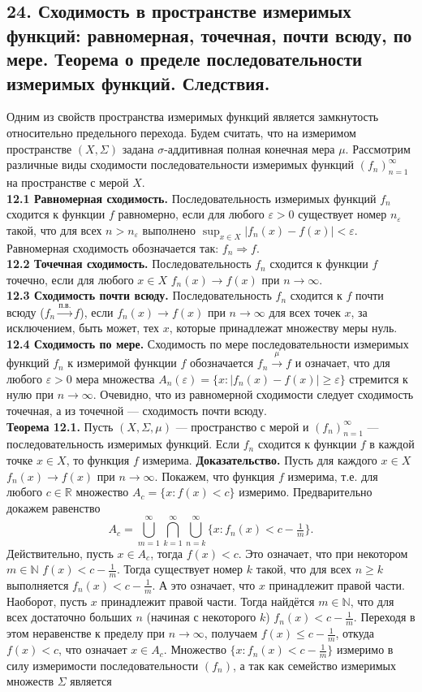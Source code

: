 \documentclass[12pt]{article}
\begin{document}
\subsection*{24. Сходимость в пространстве измеримых функций: равномерная, точечная, почти всюду,
по мере. Теорема о пределе последовательности измеримых функций. Следствия.}
Одним из свойств пространства измеримых функций является замкнутость относительно предельного перехода. Будем считать, что на измеримом пространстве $(X,\Sigma)$ задана $\sigma$-аддитивная полная конечная мера $\mu$. Рассмотрим различные виды сходимости последовательности измеримых функций $(f_n)_{n=1}^\infty$ на пространстве с мерой $X$.\\ \textbf{12.1 Равномерная сходимость.} Последовательность измеримых функций $f_n$ сходится к функции $f$ равномерно, если для любого $\varepsilon>0$ существует номер $n_\varepsilon$ такой, что для всех $n>n_\varepsilon$ выполнено $\sup_{x\in X}|f_n(x)-f(x)|<\varepsilon$. Равномерная сходимость обозначается так: $f_n\Rightarrow f$. \\\textbf{12.2 Точечная сходимость.} Последовательность $f_n$ сходится к функции $f$ точечно, если для любого $x\in X$ $f_n(x)\to f(x)$ при $n\to\infty$. \\\textbf{12.3 Сходимость почти всюду.} Последовательность $f_n$ сходится к $f$ почти всюду ($f_n\overset{\text{п.в.}}{\longrightarrow}f$), если $f_n(x)\to f(x)$ при $n\to\infty$ для всех точек $x$, за исключением, быть может, тех $x$, которые принадлежат множеству меры нуль. \\\textbf{12.4 Сходимость по мере.} Сходимость по мере последовательности измеримых функций $f_n$ к измеримой функции $f$ обозначается $f_n\overset{\mu}{\longrightarrow}f$ и означает, что для любого $\varepsilon>0$ мера множества $A_n(\varepsilon)=\{x:|f_n(x)-f(x)|\geq\varepsilon\}$ стремится к нулю при $n\to\infty$. Очевидно, что из равномерной сходимости следует сходимость точечная, а из точечной — сходимость почти всюду. \\\textbf{Теорема 12.1.} Пусть $(X,\Sigma,\mu)$ — пространство с мерой и $(f_n)_{n=1}^\infty$ — последовательность измеримых функций. Если $f_n$ сходится к функции $f$ в каждой точке $x\in X$, то функция $f$ измерима. \textbf{Доказательство.} Пусть для каждого $x\in X$ $f_n(x)\to f(x)$ при $n\to\infty$. Покажем, что функция $f$ измерима, т.е. для любого $c\in\mathbb{R}$ множество $A_c=\{x:f(x)<c\}$ измеримо. Предварительно докажем равенство \[ A_c=\bigcup_{m=1}^\infty\bigcap_{k=1}^\infty\bigcup_{n=k}^\infty\{x:f_n(x)<c-\tfrac{1}{m}\}. \] Действительно, пусть $x\in A_c$, тогда $f(x)<c$. Это означает, что при некотором $m\in\mathbb{N}$ $f(x)<c-\tfrac{1}{m}$. Тогда существует номер $k$ такой, что для всех $n\geq k$ выполняется $f_n(x)<c-\tfrac{1}{m}$. А это означает, что $x$ принадлежит правой части. Наоборот, пусть $x$ принадлежит правой части. Тогда найдётся $m\in\mathbb{N}$, что для всех достаточно больших $n$ (начиная с некоторого $k$) $f_n(x)<c-\tfrac{1}{m}$. Переходя в этом неравенстве к пределу при $n\to\infty$, получаем $f(x)\leq c-\tfrac{1}{m}$, откуда $f(x)<c$, что означает $x\in A_c$. Множество $\{x:f_n(x)<c-\tfrac{1}{m}\}$ измеримо в силу измеримости последовательности $(f_n)$, а так как семейство измеримых множеств $\Sigma$ является 
\end{document}
